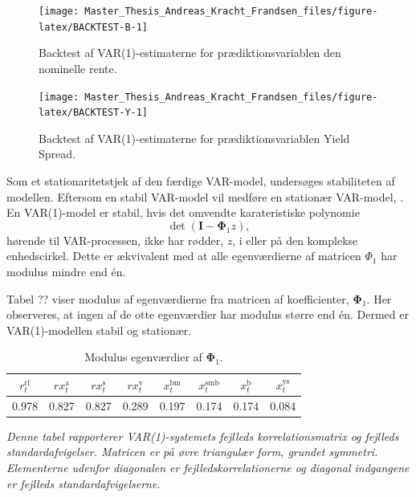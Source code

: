 \documentclass[
  a4paper,
  oneside]{memoir}
\begin{document}
\begin{figure}[H]

{\centering \texttt{[image: Master\_Thesis\_Andreas\_Kracht\_Frandsen\_files/figure-latex/BACKTEST-B-1]} 

}

\caption[short]{Backtest af VAR(1)-estimaterne for prædiktionsvariablen den nominelle rente.}\label{fig:BACKTEST-B}
\end{figure}

\begin{figure}[H]

{\centering \texttt{[image: Master\_Thesis\_Andreas\_Kracht\_Frandsen\_files/figure-latex/BACKTEST-Y-1]} 

}

\caption[short]{Backtest af VAR(1)-estimaterne for prædiktionsvariablen Yield Spread.}\label{fig:BACKTEST-Y}
\end{figure}

Som et stationaritetstjek af den færdige VAR-model, undersøges stabiliteten af modellen. Eftersom en stabil VAR-model vil medføre en stationær VAR-model, \citep{Lutkepohl2005}. En VAR(1)-model er stabil, hvis det omvendte karateristiske polynomie
\[\det\left(\bm{I} - \bm{\Phi}_1 z\right),\]
hørende til VAR-processen, ikke har rødder, \(z\), i eller på den komplekse enhedscirkel. Dette er ækvivalent med at alle egenværdierne af matricen \(\Phi_1\) har modulus mindre end én.

Tabel ?? viser modulus af egenværdierne fra matricen af koefficienter, \(\bm{\Phi}_1\). Her observeres, at ingen af de otte egenværdier har modulus større end én. Dermed er VAR(1)-modellen stabil og stationær.

\begin{table}[H]

\caption{\label{tab:ROOTS-VAR}Modulus egenværdier af $\bm{\Phi}_1$.}
\centering
\begin{threeparttable}
\begin{tabular}[t]{cccccccc}
\toprule
$r_t^{\text{rf}}$ & $rx_t^{\text{a}}$ & $rx_t^{\text{s}}$ & $rx_t^{\text{v}}$ & $x_t^{\text{bm}}$ & $x_t^{\text{smb}}$ & $x_t^{\text{b}}$ & $x_t^{\text{ys}}$\\
\midrule
\rowcolor{gray!6}  0.978 & 0.827 & 0.827 & 0.289 & 0.197 & 0.174 & 0.174 & 0.084\\
\bottomrule
\end{tabular}
\begin{tablenotes}
\item \textit{Denne tabel rapporterer VAR(1)-systemets fejlleds korrelationsmatrix og fejlleds standardafvigelser. Matricen er på øvre triangulær form, grundet symmetri. Elementerne udenfor diagonalen er fejlledskorrelationerne og diagonal indgangene er fejlleds standardafvigelserne.}
\end{tablenotes}
\end{threeparttable}
\end{table}
\end{document}
